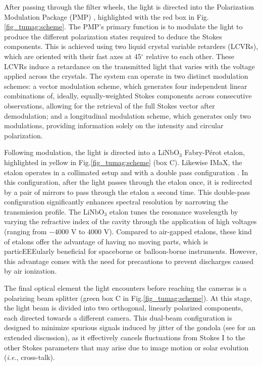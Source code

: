 After passing through the filter wheels, the light is directed into the Polarization Modulation Package (PMP) \citep{pmp1}, highlighted with the red box in Fig.\ref{fig_tumag:scheme}. The PMP's primary function is to modulate the light to produce the different polarization states required to deduce the Stokes components. This is achieved using two liquid crystal variable retarders (LCVRs), which are oriented with their fast axes at 45$^\circ$ relative to each other. These LCVRs induce a retardance on the transmitted light that varies with the voltage applied across the crystals. The system can operate in two distinct modulation schemes: a vector modulation scheme, which generates four independent linear combinations of, ideally, equally-weighted Stokes components across consecutive observations, allowing for the retrieval of the full Stokes vector after demodulation; and a longitudinal modulation scheme, which generates only two modulations, providing information solely on the intensity and circular polarization.

Following modulation, the light is directed into a LiNbO$_3$ Fabry-Pérot etalon, highlighted in yellow in Fig.\ref{fig_tumag:scheme} (box C). Likewise IMaX, the etalon operates in a collimated setup and with a double pass configuration \citep{etalon-doublepass}. In this configuration, after the light passes through the etalon once, it is redirected by a pair of mirrors to pass through the etalon a second time. This double-pass configuration significantly enhances spectral resolution by narrowing the transmission profile. The LiNbO$_3$ etalon tunes the resonance wavelength by varying the refractive index of the cavity through the application of high voltages (ranging from $-4000$ V to $4000$ V). Compared to air-gapped etalons, these kind of etalons offer the advantage of having no moving parts, which is particEEEularly beneficial for spaceborne or balloon-borne instruments. However, this advantage comes with the need for precautions to prevent discharges caused by air ionization.

The final optical element the light encounters before reaching the cameras is a polarizing beam splitter (green box C in Fig.\ref{fig_tumag:scheme}). At this stage, the light beam is divided into two orthogonal, linearly polarized components, each directed towards a different camera. This dual-beam configuration \citep{lites-doublebeam} is designed to minimize spurious signals induced by jitter of the gondola (see \citealt{libro_JoseCarlos} for an extended discussion), as it effectively cancels fluctuations from Stokes I to the other Stokes parameters that may arise due to image motion or solar evolution (\textit{i.e.}, cross-talk).

